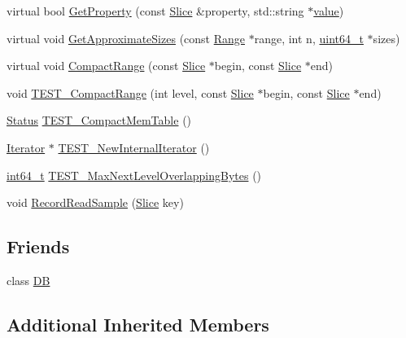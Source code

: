 \begin{DoxyCompactItemize}
\item 
virtual bool \hyperlink{classleveldb_1_1_d_b_impl_ad1a2023ce171c8f8476664f5b1cbab4d}{Get\+Property} (const \hyperlink{classleveldb_1_1_slice}{Slice} \&property, std\+::string $\ast$\hyperlink{cache_8cc_a0f61d63b009d0880a89c843bd50d8d76}{value})
\item 
virtual void \hyperlink{classleveldb_1_1_d_b_impl_af08e218d92064699942c195ce0f06010}{Get\+Approximate\+Sizes} (const \hyperlink{structleveldb_1_1_range}{Range} $\ast$range, int n, \hyperlink{stdint_8h_aaa5d1cd013383c889537491c3cfd9aad}{uint64\+\_\+t} $\ast$sizes)
\item 
virtual void \hyperlink{classleveldb_1_1_d_b_impl_aa6df0739fc0b49380c284347e411b8ed}{Compact\+Range} (const \hyperlink{classleveldb_1_1_slice}{Slice} $\ast$begin, const \hyperlink{classleveldb_1_1_slice}{Slice} $\ast$end)
\item 
void \hyperlink{classleveldb_1_1_d_b_impl_a63fcb49466b689a534ba77d32cf84f99}{T\+E\+S\+T\+\_\+\+Compact\+Range} (int level, const \hyperlink{classleveldb_1_1_slice}{Slice} $\ast$begin, const \hyperlink{classleveldb_1_1_slice}{Slice} $\ast$end)
\item 
\hyperlink{classleveldb_1_1_status}{Status} \hyperlink{classleveldb_1_1_d_b_impl_a8642703fd1398cd8e3f5f24ee0b9da23}{T\+E\+S\+T\+\_\+\+Compact\+Mem\+Table} ()
\item 
\hyperlink{classleveldb_1_1_iterator}{Iterator} $\ast$ \hyperlink{classleveldb_1_1_d_b_impl_adba5bf4252bd94f7db50e62921b7ba53}{T\+E\+S\+T\+\_\+\+New\+Internal\+Iterator} ()
\item 
\hyperlink{stdint_8h_adec1df1b8b51cb32b77e5b86fff46471}{int64\+\_\+t} \hyperlink{classleveldb_1_1_d_b_impl_af621636048b8d3cfaa21238fe26ef0ca}{T\+E\+S\+T\+\_\+\+Max\+Next\+Level\+Overlapping\+Bytes} ()
\item 
void \hyperlink{classleveldb_1_1_d_b_impl_a254ae98e3425046c28ed0aa6d78b37d8}{Record\+Read\+Sample} (\hyperlink{classleveldb_1_1_slice}{Slice} key)
\end{DoxyCompactItemize}
\subsection*{Friends}
\begin{DoxyCompactItemize}
\item 
class \hyperlink{classleveldb_1_1_d_b_impl_ad22eb7a23cbf34de526efa966c578d4a}{D\+B}
\end{DoxyCompactItemize}
\subsection*{Additional Inherited Members}


